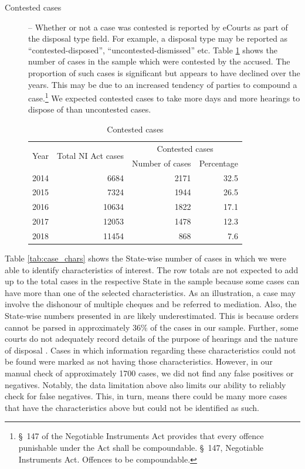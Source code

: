 \documentclass[12pt,a4paper]{article}
\begin{document}
\begin{description}
\item[]

\item [Contested cases] -- Whether or not a case was contested is reported by eCourts as part of the disposal type field. For example, a disposal type may be reported as ``contested-disposed'', ``uncontested-dismissed'' etc. Table \ref{tab:cont_yearWise} shows the number of cases in the sample which were contested by the accused. The proportion of such cases is significant but appears to have declined over the years. This may be due to an increased tendency of parties to compound a case.\footnote{\S~147 of the Negotiable Instruments Act provides that every offence punishable under the Act shall be compoundable. \S~147, Negotiable Instruments Act. Offences to be compoundable.} We expected contested cases to take more days and more hearings to dispose of than uncontested cases.

\begin{table}[!ht]
\caption{Contested cases}\label{tab:cont_yearWise}
\centering
\footnotesize
\begin{tabular}{@{}lrrr@{}}
\toprule
\multirow{2}{*}{Year} & \multirow{2}{*}{Total NI Act cases} & \multicolumn{2}{c}{Contested cases}\\
\cmidrule{3-4}
&& Number of cases & Percentage \\
\midrule%
2014 & 6684 & 2171 & 32.5 \\
2015 & 7324 & 1944 & 26.5 \\
2016 & 10634 & 1822 & 17.1 \\
2017 & 12053 & 1478 & 12.3 \\
2018 & 11454 & 868 & 7.6 \\
\bottomrule
\end{tabular}
\end{table}

\item[]

\end{description}

Table \ref{tab:case_chars} shows the State-wise number of cases in which we were able to identify characteristics of interest. The row totals are not expected to add up to the total cases in the respective State in the sample because some cases can have more than one of the selected characteristics. As an illustration, a case may involve the dishonour of multiple cheques and be referred to mediation. Also, the State-wise numbers presented in  are likely underestimated. This is because orders cannot be parsed in approximately 36\% of the cases in our sample. Further, some courts do not adequately record details of the purpose of hearings and the nature of disposal \autocite{damle2020_ecourtsData}. Cases in which information regarding these characteristics could not be found were marked as not having those characteristics. However, in our manual check of approximately 1700 cases, we did not find any false positives or negatives. Notably, the data limitation above also limits our ability to reliably check for false negatives. This, in turn, means there could be many more cases that have the characteristics above but could not be identified as such.
\end{document}
